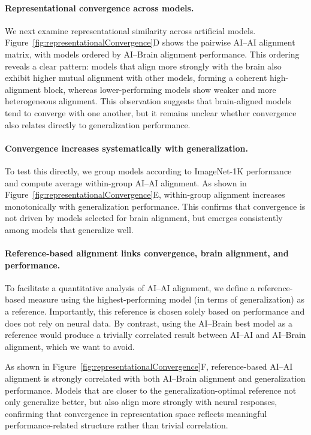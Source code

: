 \documentclass{article}
\theoremstyle{plain}
\theoremstyle{definition}
\theoremstyle{remark}
\begin{document}
\paragraph{Representational convergence across models.}
We next examine representational similarity across artificial models.
Figure~\ref{fig:representationalConvergence}D shows the pairwise AI--AI alignment matrix, with models ordered by AI--Brain alignment performance.
This ordering reveals a clear pattern: models that align more strongly with the brain also exhibit higher mutual alignment with other models, forming a coherent high-alignment block, whereas lower-performing models show weaker and more heterogeneous alignment.
This observation suggests that brain-aligned models tend to converge with one another, but it remains unclear whether convergence also relates directly to generalization performance.

\paragraph{Convergence increases systematically with generalization.}
To test this directly, we group models according to ImageNet-1K performance and compute average within-group AI--AI alignment.
As shown in Figure~\ref{fig:representationalConvergence}E, within-group alignment increases monotonically with generalization performance.
This confirms that convergence is not driven by models selected for brain alignment, but emerges consistently among models that generalize well.

\paragraph{Reference-based alignment links convergence, brain alignment, and performance.}
To facilitate a quantitative analysis of AI--AI alignment, we define a reference-based measure using the highest-performing model (in terms of generalization) as a reference.
Importantly, this reference is chosen solely based on performance and does not rely on neural data.
By contrast, using the AI--Brain best model as a reference would produce a trivially correlated result between AI--AI and AI--Brain alignment, which we want to avoid.


As shown in Figure~\ref{fig:representationalConvergence}F, reference-based AI--AI alignment is strongly correlated with both AI--Brain alignment and generalization performance.
Models that are closer to the generalization-optimal reference not only generalize better, but also align more strongly with neural responses, confirming that convergence in representation space reflects meaningful performance-related structure rather than trivial correlation.
\end{document}

